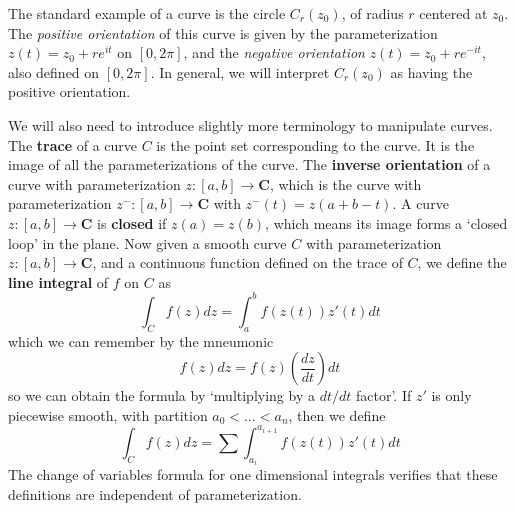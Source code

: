 \begin{example}
    The standard example of a curve is the circle $C_r(z_0)$, of radius $r$ centered at $z_0$. The {\it positive orientation} of this curve is given by the parameterization $z(t) = z_0 + re^{it}$ on $[0,2\pi]$, and the {\it negative orientation} $z(t) = z_0 + re^{-it}$, also defined on $[0,2\pi]$. In general, we will interpret $C_r(z_0)$ as having the positive orientation.
\end{example}

We will also need to introduce slightly more terminology to manipulate curves. The {\bf trace} of a curve $C$ is the point set corresponding to the curve. It is the image of all the parameterizations of the curve. The {\bf inverse orientation} of a curve with parameterization $z: [a,b] \to \mathbf{C}$, which is the curve with parameterization $z^-: [a,b] \to \mathbf{C}$ with $z^-(t) = z(a+b-t)$. A curve $z: [a,b] \to \mathbf{C}$ is {\bf closed} if $z(a) = z(b)$, which means its image forms a `closed loop' in the plane. Now given a smooth curve $C$ with parameterization $z: [a,b] \to \mathbf{C}$, and a continuous function defined on the trace of $C$, we define the {\bf line integral} of $f$ on $C$ as
%
\[ \int_C f(z) dz = \int_a^b f(z(t)) z'(t) dt \]
%
which we can remember by the mneumonic
%
\[ f(z) dz = f(z) \left( \frac{dz}{dt} \right) dt \]
%
so we can obtain the formula by `multiplying by a $dt/dt$ factor'. If $z'$ is only piecewise smooth, with partition $a_0 < \dots < a_n$, then we define
%
\[ \int_C f(z) dz = \sum \int_{a_i}^{a_{i+1}} f(z(t)) z'(t) dt \]
%
The change of variables formula for one dimensional integrals verifies that these definitions are independent of parameterization.

